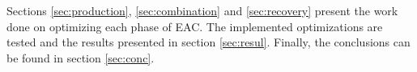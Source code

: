 Sections \ref{sec:production}, \ref{sec:combination} and \ref{sec:recovery} present the work done on optimizing each phase of EAC.
The implemented optimizations are tested and the results presented in section \ref{sec:resul}.
Finally, the conclusions can be found in section \ref{sec:conc}.






